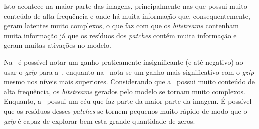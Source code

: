 Isto acontece na maior parte das imagens, principalmente nas que possui muito conteúdo de alta frequência e onde há muita informação que, consequentemente, geram latentes muito complexos, o que faz com que os \textit{bitstreams} contenham muita informação já que os resíduos dos \textit{patches} contém muita informação e geram muitas ativações no modelo.


Na~ é possível notar um ganho praticamente insignificante (e até negativo) ao usar o \textit{gzip} para a~, enquanto na~ nota-se um ganho mais significativo com o \textit{gzip} mesmo nos níveis mais superiores. Considerando que a~ possui muito conteúdo de alta frequência, os \textit{bitstreams} gerados pelo modelo se tornam muito complexos. Enquanto, a~ possui um céu que faz parte da maior parte da imagem. É possível que os resíduos desses \textit{patches} se tornem pequenos muito rápido de modo que o \textit{gzip} é capaz de explorar bem esta grande quantidade de zeros.

